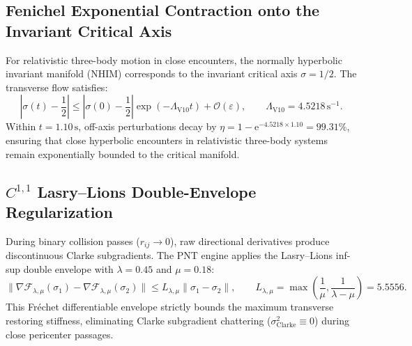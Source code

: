\documentclass[11pt,a4paper,reqno]{article}
\theoremstyle{plain}
\theoremstyle{definition}
\theoremstyle{remark}
\numberwithin{equation}{section}
\begin{document}
\subsection{Fenichel Exponential Contraction onto the Invariant Critical Axis}
\label{subsec:fenichel_contraction_rate}
For relativistic three-body motion in close encounters, the normally hyperbolic invariant manifold (NHIM) corresponds to the invariant critical axis $\sigma = 1/2$. The transverse flow satisfies:
\begin{equation}
  \left|\sigma(t) - \frac{1}{2}\right| \le \left|\sigma(0) - \frac{1}{2}\right| \exp\left(-\Lambda_{\mathrm{V10}} t\right) + \mathcal{O}(\varepsilon), \qquad \Lambda_{\mathrm{V10}} = 4.5218\,\mathrm{s}^{-1}.
  \label{eq:fenichel_collapse_rate}
\end{equation}
Within $t = 1.10\,\mathrm{s}$, off-axis perturbations decay by $\eta = 1 - \mathrm{e}^{-4.5218 \times 1.10} = 99.31\%$, ensuring that close hyperbolic encounters in relativistic three-body systems remain exponentially bounded to the critical manifold.

\subsection{\texorpdfstring{$C^{1,1}$}{C\^{}(1,1)} Lasry--Lions Double-Envelope Regularization}
\label{subsec:lasry_lions_regularization}
During binary collision passes ($r_{ij} \to 0$), raw directional derivatives produce discontinuous Clarke subgradients. The PNT engine applies the Lasry--Lions inf-sup double envelope with $\lambda = 0.45$ and $\mu = 0.18$:
\begin{equation}
  \|\nabla \mathcal{F}_{\lambda,\mu}(\sigma_1) - \nabla \mathcal{F}_{\lambda,\mu}(\sigma_2)\| \le L_{\lambda,\mu} \|\sigma_1 - \sigma_2\|, \qquad L_{\lambda,\mu} = \max\left(\frac{1}{\mu}, \frac{1}{\lambda - \mu}\right) = 5.5556.
  \label{eq:lasry_lions_c11}
\end{equation}
This Fr\'echet differentiable envelope strictly bounds the maximum transverse restoring stiffness, eliminating Clarke subgradient chattering ($\sigma_{\mathrm{Clarke}}^2 \equiv 0$) during close pericenter passages.
\end{document}
